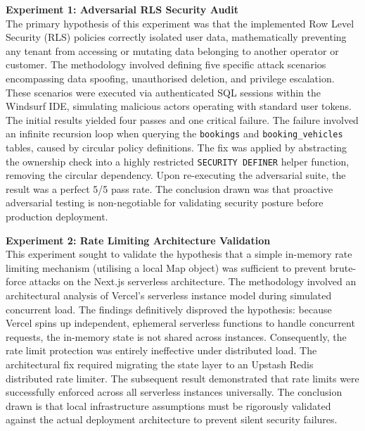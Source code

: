 \documentclass[12pt,a4paper]{report}
\begin{document}
\textbf{Experiment 1: Adversarial RLS Security Audit}\\
The primary hypothesis of this experiment was that the implemented Row Level Security (RLS) policies correctly isolated user data, mathematically preventing any tenant from accessing or mutating data belonging to another operator or customer. The methodology involved defining five specific attack scenarios encompassing data spoofing, unauthorised deletion, and privilege escalation. These scenarios were executed via authenticated SQL sessions within the Windsurf IDE, simulating malicious actors operating with standard user tokens. The initial results yielded four passes and one critical failure. The failure involved an infinite recursion loop when querying the \texttt{bookings} and \texttt{booking\_vehicles} tables, caused by circular policy definitions. The fix was applied by abstracting the ownership check into a highly restricted \texttt{SECURITY DEFINER} helper function, removing the circular dependency. Upon re-executing the adversarial suite, the result was a perfect 5/5 pass rate. The conclusion drawn was that proactive adversarial testing is non-negotiable for validating security posture before production deployment.

\textbf{Experiment 2: Rate Limiting Architecture Validation}\\
This experiment sought to validate the hypothesis that a simple in-memory rate limiting mechanism (utilising a local Map object) was sufficient to prevent brute-force attacks on the Next.js serverless architecture. The methodology involved an architectural analysis of Vercel's serverless instance model during simulated concurrent load. The findings definitively disproved the hypothesis: because Vercel spins up independent, ephemeral serverless functions to handle concurrent requests, the in-memory state is not shared across instances. Consequently, the rate limit protection was entirely ineffective under distributed load. The architectural fix required migrating the state layer to an Upstash Redis distributed rate limiter. The subsequent result demonstrated that rate limits were successfully enforced across all serverless instances universally. The conclusion drawn is that local infrastructure assumptions must be rigorously validated against the actual deployment architecture to prevent silent security failures.
\end{document}
